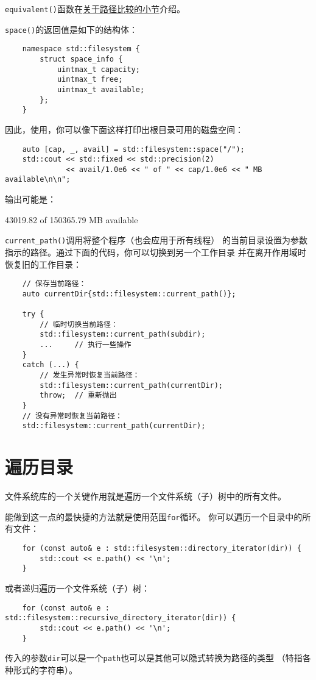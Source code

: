 \texttt{equivalent()}函数在\hyperref[ch20.3.6]{关于路径比较的小节}介绍。

\texttt{space()}的返回值是如下的结构体：
\begin{lstlisting}
    namespace std::filesystem {
        struct space_info {
            uintmax_t capacity;
            uintmax_t free;
            uintmax_t available;
        };
    }
\end{lstlisting}
因此，使用，你可以像下面这样打印出根目录可用的磁盘空间：
\begin{lstlisting}
    auto [cap, _, avail] = std::filesystem::space("/");
    std::cout << std::fixed << std::precision(2)
              << avail/1.0e6 << " of " << cap/1.0e6 << " MB available\n\n";
\end{lstlisting}
输出可能是：
\begin{blacklisting}
    43019.82 of 150365.79 MB available
\end{blacklisting}
\texttt{current\_path()}调用将整个程序（也会应用于所有线程）
的当前目录设置为参数指示的路径。通过下面的代码，你可以切换到另一个工作目录
并在离开作用域时恢复旧的工作目录：
\begin{lstlisting}
    // 保存当前路径：
    auto currentDir{std::filesystem::current_path()};

    try {
        // 临时切换当前路径：
        std::filesystem::current_path(subdir);
        ...     // 执行一些操作
    }
    catch (...) {
        // 发生异常时恢复当前路径：
        std::filesystem::current_path(currentDir);
        throw;  // 重新抛出
    }
    // 没有异常时恢复当前路径：
    std::filesystem::current_path(currentDir);
\end{lstlisting}


\section{遍历目录}\label{ch20.5}
文件系统库的一个关键作用就是遍历一个文件系统（子）树中的所有文件。

能做到这一点的最快捷的方法就是使用范围\texttt{for}循环。
你可以遍历一个目录中的所有文件：
\begin{lstlisting}
    for (const auto& e : std::filesystem::directory_iterator(dir)) {
        std::cout << e.path() << '\n';
    }
\end{lstlisting}
或者递归遍历一个文件系统（子）树：
\begin{lstlisting}
    for (const auto& e : std::filesystem::recursive_directory_iterator(dir)) {
        std::cout << e.path() << '\n';
    }
\end{lstlisting}
传入的参数\texttt{dir}可以是一个\texttt{path}也可以是其他可以隐式转换为路径的类型
（特指各种形式的字符串）。\label{遍历.}

